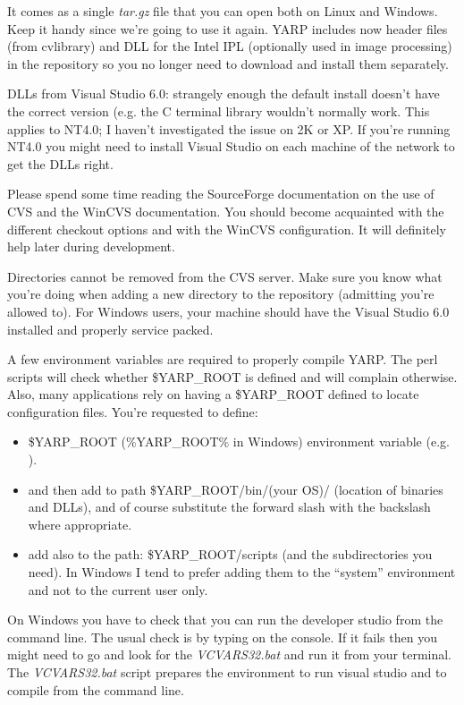 It comes as a single {\em tar.gz} file that you can open both on Linux and Windows. Keep it handy since we're going to use it again. YARP includes now header files (from cvlibrary) and DLL for the Intel IPL (optionally used in image processing) in the repository so you no longer need to download and install them separately.

DLLs from Visual Studio 6.0: strangely enough the default install doesn't have the
correct version (e.g. the C terminal library wouldn't normally work. This applies to
NT4.0; I haven't investigated the issue on 2K or XP. If you're running NT4.0 you might
need to install Visual Studio on each machine of the network to get the DLLs right.

Please spend some time reading the SourceForge documentation on the use of CVS and
the WinCVS documentation. You should become acquainted with the different checkout
options and with the WinCVS configuration. It will definitely help later during
development.

Directories cannot be removed from the CVS server. Make sure you know what
you're doing when adding a new directory to the repository (admitting you're allowed to).
For Windows users, your machine should have the Visual Studio 6.0 installed and properly
service packed.

A few environment variables are required to properly compile YARP. The perl scripts will check whether \$YARP\_ROOT is defined and will complain otherwise. Also, many applications rely on having a \$YARP\_ROOT defined to locate configuration files. You're requested to define:
\begin{itemize}
\item \$YARP\_ROOT (\%YARP\_ROOT\% in Windows) environment variable (e.g. ).
\item and then add to path \$YARP\_ROOT/bin/(your OS)/ (location of binaries and DLLs), and of course substitute the forward slash with the backslash where appropriate.
\item add also to the path: \$YARP\_ROOT/scripts (and the subdirectories you need). In Windows I tend to prefer adding them to the ``system'' environment and not to the current user only.
\end{itemize}

On Windows you have to check that you can run the developer studio from the command line. The usual check is by typing  on the console. If it fails then you might need to go and look for the {\em VCVARS32.bat} and run it from your terminal. The {\em VCVARS32.bat} script prepares the environment to run visual studio and to compile from the command line.


